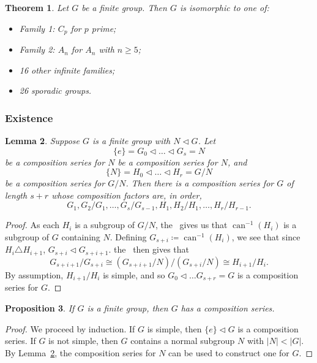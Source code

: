 \documentclass[12pt]{report}
\newcommand{\iso}{\cong}
\newcommand{\can}{\operatorname{can}}
\newtheorem{theorem}{Theorem}[section] %
\newtheorem{lemma}[theorem]{Lemma}
\newtheorem{proposition}[theorem]{Proposition}
\theoremstyle{definition}
\begin{document}
\begin{theorem}
  Let \(G\) be a finite group. Then \(G\) is isomorphic to one of:
  \begin{itemize}
    \item Family 1: \(C_{p}\) for \(p\) prime;
    \item Family 2: \(A_{n}\) for \(A_{n}\) with \(n \geq 5\);
    \item 16 other infinite families;
    \item 26 sporadic groups.
  \end{itemize}
\end{theorem}

\subsubsection*{Existence}
\begin{lemma}\label{lem:group-theory:composing-composition-series}
  Suppose \(G\) is a finite group with \(N \triangleleft G\). Let
  \[\{e\} = G_{0} \triangleleft \ldots \triangleleft G_{s} = N \]
  be a composition series for \(N\) be a composition series for \(N\), and
  \[\{N\} = H_{0} \triangleleft \ldots \triangleleft H_{r} = G / N\]
  be a composition series for \(G/N\). Then there is a composition series for \(G\) of length \(s + r\) whose composition factors are, in order,
  \[G_{1}, G_{2}/G_{1}, \ldots, G_{s}/ G_{s-1}, H_{1}, H_{2}/H_{1}, \ldots, H_{r}/H_{r-1}.\]
\end{lemma}

\begin{proof}
  As each \(H_{i}\) is a subgroup of \(G/N\), the~ gives us that \(\can^{-1}(H_{i})\) is a subgroup of \(G\) containing \(N\). Defining \(G_{s + i} \coloneqq \can^{-1}(H_{i})\), we see that since \(H_{i} \triangle H_{i+1}\), \(G_{s+i} \triangleleft G_{s+i+1}\). the~ then gives that
  \[G_{s+i+1} / G_{s+i} \iso (G_{s+i+1} / N) / (G_{s + i} / N) \iso H_{i+1} / H_{i}.\]
  By assumption, \(H_{i+1} / H_{i}\) is simple, and so \(G_{0} \triangleleft \ldots G_{s+r} = G\) is a composition series for \(G\).
\end{proof}


\begin{proposition}
  If \(G\) is a finite group, then \(G\) has a composition series.
\end{proposition}

\begin{proof}
  We proceed by induction. If \(G\) is simple, then \(\{e\} \triangleleft G\) is a composition series. If \(G\) is not simple, then \(G\) contains a normal subgroup \(N\) with \(|N| < |G|\). By Lemma~\ref{lem:group-theory:composing-composition-series}, the composition series for \(N\) can be used to construct one for \(G\).
\end{proof}
\end{document}
